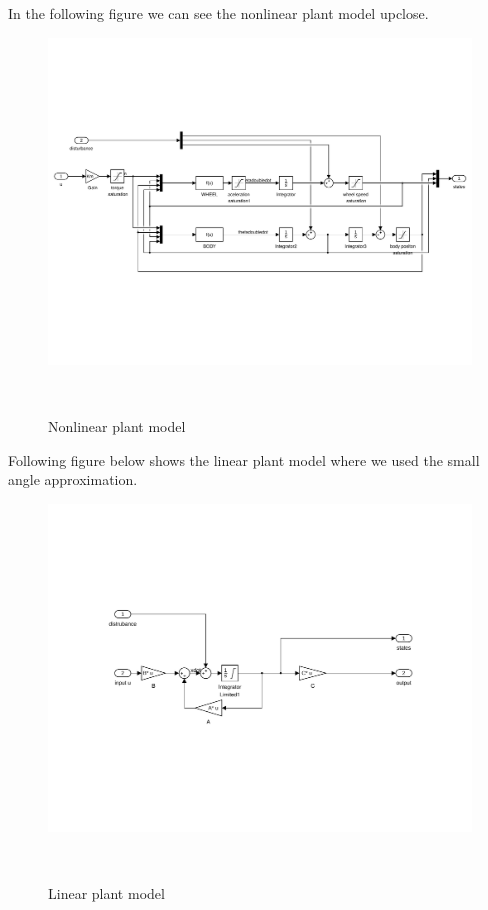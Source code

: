 \clearpage
In the following figure we can see the nonlinear plant model upclose.
\begin{figure}[H]

	
	\centering
 	\includegraphics[width=1\textwidth]{images/nonlin.pdf}
	
	~
	\caption{Nonlinear plant model} 
 	\label{fig:mech} 
\end{figure}

\clearpage
Following figure below shows the linear plant model where we used the small angle approximation.
\begin{figure}[H]

	
	\centering
 	\includegraphics[width=1\textwidth]{images/ssnon.pdf}
	
	~
	\caption{Linear plant model} 
 	\label{fig:mech} 
\end{figure}

